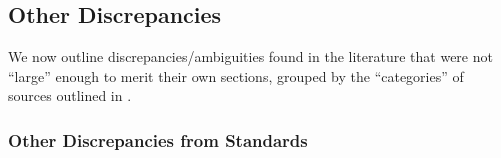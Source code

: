 

\subsection{Other Discrepancies}
\label{other-discrep}

We now outline discrepancies/ambiguities found in the literature that were not
``large'' enough to merit their own sections, grouped by the ``categories'' of
sources outlined in .

\subsubsection{Other Discrepancies from Standards} %

